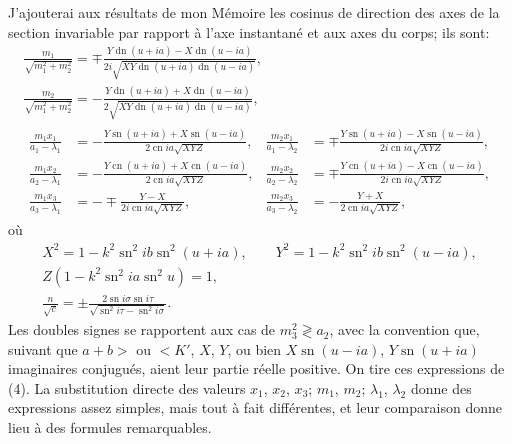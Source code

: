 \documentclass[11pt,leqno,oneside,letterpaper]{book}[2005/09/16]
\DeclareMathOperator{\sn}{sn}
\DeclareMathOperator{\cn}{cn}
\DeclareMathOperator{\dn}{dn}
\begin{document}
J'ajouterai aux r\'esultats de mon M\'emoire les cosinus de direction des
axes de la section invariable par rapport \`a l'axe instantan\'e et aux axes du
corps; ils sont:
\begin{gather*}
\tfrac{m_1}{\sqrt{m_1^2+m_2^2}} =\mp\tfrac{Y\dn(u+ia)-X\dn(u-ia)}{2i\sqrt{XY\dn(u+ia)\dn(u-ia)}},
\\
\tfrac{m_2}{\sqrt{m_1^2+m_2^2}} =-\tfrac{Y\dn(u+ia)+X\dn(u-ia)}{2\sqrt{XY\dn(u+ia)\dn(u-ia)}},
\\[0.7ex]
\begin{aligned}
  \tfrac{m_1x_1}{a_1-\lambda_1}
&=-\tfrac{Y\sn(u+ia)+X\sn(u-ia)}{2\cn ia\sqrt{XYZ}},
& \tfrac{m_2x_1}{a_1-\lambda_2}
&=\mp\tfrac{Y\sn(u+ia)-X\sn(u-ia)}{2i\cn ia\sqrt{XYZ}},
\\
\tfrac{m_1x_2}{a_2-\lambda_1}
&=-\tfrac{Y\cn(u+ia)+X\cn(u-ia)}{2\cn ia\sqrt{XYZ}},
& \tfrac{m_2x_2}{a_2-\lambda_2}
&=\mp\tfrac{Y\cn(u+ia)-X\cn(u-ia)}{2i\cn ia\sqrt{XYZ}},
\\
\tfrac{m_1x_3}{a_3-\lambda_1}
&=-\mp\tfrac{Y-X}{2i\cn ia\sqrt{XYZ}},
& \tfrac{m_2x_3}{a_3-\lambda_2}
&=-\tfrac{Y+X}{2\cn ia\sqrt{XYZ}},
\end{aligned}
\end{gather*}
o\`u
\begin{gather*}
  X^2= 1-k^2 \sn^2 ib \sn^2(u + ia),\qquad
  Y^2= 1-k^2 \sn^2 ib \sn^2(u - ia),\\
  Z(1-k^2 \sn^2 ia \sn^2 u) =1, \\
  \frac{n}{\sqrt{c}} =
    \pm\frac{2\sn i\sigma \sn i\tau}{\sqrt{\sn^2 i\tau - \sn^2 i\sigma}} .
\end{gather*}
Les doubles signes se rapportent aux cas de $m_3^2\gtrless a_2$, avec la convention
que, suivant que $a+b >$ ou $<K'$, $X$, $Y$, ou bien $X\sn(u-ia)$, $Y\sn(u+ia)$
imaginaires conjugu\'es, aient leur partie r\'eelle positive. On tire ces expressions
de (4). La substitution directe des valeurs $x_1$, $x_2$, $x_3$; $m_1$, $m_2$; $\lambda_1$, $\lambda_2$
donne des expressions assez simples, mais tout \`a fait diff\'erentes, et leur
comparaison donne lieu \`a des formules remarquables.\fg %
\bigskip
\end{document}
